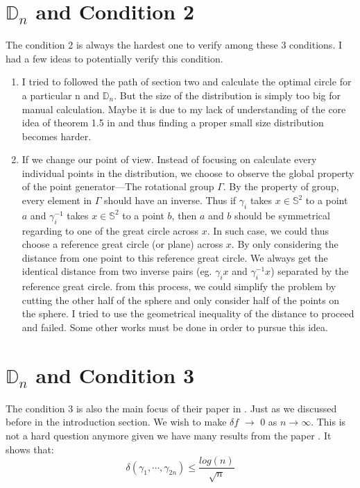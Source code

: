 \documentclass[12pt]{article}
\numberwithin{equation}{section}
\let\bb\mathbb
\let\bb\mathbb
\begin{document}
	\section{$\bb{D}_n$ and Condition 2}
	The condition 2 is always the hardest one to verify among these 3 conditions. I had a few ideas to potentially verify this condition.\par 
	\begin{enumerate}
		\item I tried to followed the path of section two and calculate the optimal circle for a particular n and $\bb{D}_n$. But the size of the distribution is simply too big for manual calculation. Maybe it is due to my lack of understanding of the core idea of theorem 1.5 in \cite{lubotzky_1986_hecke} and thus finding a proper small size distribution becomes harder.
		\item If we change our point of view. Instead of focusing on calculate every individual points in the distribution, we choose to observe the global property of the point generator---The rotational group $\Gamma$. By the property of group, every element in $\Gamma$ should have an inverse. Thus if $\gamma_i$ takes $x \in \bb{S}^2$ to a point $a$ and $\gamma_i^{-1}$ takes $x \in \bb{S}^2$ to a point $b$, then $a$ and $b$ should be symmetrical regarding to one of the great circle across $x$. In such case, we could thus choose a reference great circle (or plane) across $x$. By only considering the distance from one point to this reference great circle. We always get the identical distance from two inverse pairs (eg. $\gamma_ix$ and $\gamma_i^{-1}x$) separated by the reference great circle. from this process, we could simplify the problem by cutting the other half of the sphere and only consider half of the points on the sphere. I tried to use the geometrical inequality of the distance to proceed and failed. Some other works must be done in order to pursue this idea.
	\end{enumerate}
	
	\newpage
	
	\section{$\bb{D}_n$ and Condition 3}
		The condition 3 is also the main focus of their paper in \cite{lubotzky_1986_hecke}. Just as we discussed before in the introduction section. We wish to make $\delta f$  $\rightarrow$ 0 as $n \rightarrow \infty$. This is not a hard question anymore given we have many results from the paper \cite{lubotzky_1986_hecke}. It shows that: 
		\[ \delta(\gamma_1, \cdots, \gamma_{2n}) \leq \frac{log(n)}{\sqrt{n}} \]
		
\end{document}
